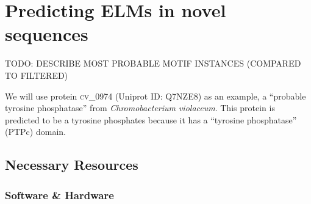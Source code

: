 \documentclass[12pt]{article}
\newcommand\uniprot[1]{%
	\textsc{\lowercase{#1}}{}%
}
\begin{document}
\clearpage

\section{Predicting ELMs in novel sequences}
\label{sec:predicting_cv_0974}

TODO: DESCRIBE MOST PROBABLE MOTIF INSTANCES (COMPARED TO FILTERED)

We will use protein \uniprot{CV\_0974} (Uniprot ID: Q7NZE8) as an example, a
``probable tyrosine phosphatase'' from \textit{Chromobacterium violaceum}.
This protein is predicted to be a tyrosine phosphates because it has a
``tyrosine phosphatase'' (PTPc) domain.

%
%
\subsection*{Necessary Resources}
\subsubsection*{Software \& Hardware}

\end{document}
